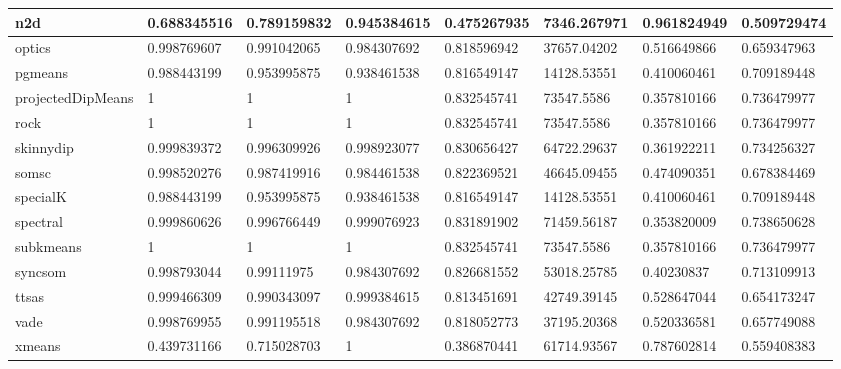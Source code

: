 \begin{table}[H]
\begin{tabular}{|l|l|l|l|l|l|l|l|}
\hline
n2d & 0.688345516 & 0.789159832 & 0.945384615 & 0.475267935 & 7346.267971 & 0.961824949 & 0.509729474 \\
\hline
optics & 0.998769607 & 0.991042065 & 0.984307692 & 0.818596942 & 37657.04202 & 0.516649866 & 0.659347963 \\
\hline
pgmeans & 0.988443199 & 0.953995875 & 0.938461538 & 0.816549147 & 14128.53551 & 0.410060461 & 0.709189448 \\
\hline
projectedDipMeans & 1 & 1 & 1 & 0.832545741 & 73547.5586 & 0.357810166 & 0.736479977 \\
\hline
rock & 1 & 1 & 1 & 0.832545741 & 73547.5586 & 0.357810166 & 0.736479977 \\
\hline
skinnydip & 0.999839372 & 0.996309926 & 0.998923077 & 0.830656427 & 64722.29637 & 0.361922211 & 0.734256327 \\
\hline
somsc & 0.998520276 & 0.987419916 & 0.984461538 & 0.822369521 & 46645.09455 & 0.474090351 & 0.678384469 \\
\hline
specialK & 0.988443199 & 0.953995875 & 0.938461538 & 0.816549147 & 14128.53551 & 0.410060461 & 0.709189448 \\
\hline
spectral & 0.999860626 & 0.996766449 & 0.999076923 & 0.831891902 & 71459.56187 & 0.353820009 & 0.738650628 \\
\hline
subkmeans & 1 & 1 & 1 & 0.832545741 & 73547.5586 & 0.357810166 & 0.736479977 \\
\hline
syncsom & 0.998793044 & 0.99111975 & 0.984307692 & 0.826681552 & 53018.25785 & 0.40230837 & 0.713109913 \\
\hline
ttsas & 0.999466309 & 0.990343097 & 0.999384615 & 0.813451691 & 42749.39145 & 0.528647044 & 0.654173247 \\
\hline
vade & 0.998769955 & 0.991195518 & 0.984307692 & 0.818052773 & 37195.20368 & 0.520336581 & 0.657749088 \\
\hline
xmeans & 0.439731166 & 0.715028703 & 1 & 0.386870441 & 61714.93567 & 0.787602814 & 0.559408383 \\
\hline
\end{tabular}
\end{table}

\clearpage

